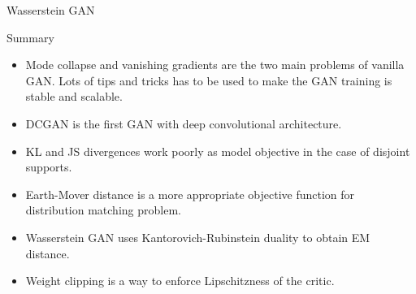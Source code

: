 \begin{frame}{Wasserstein GAN}
\end{frame}
\begin{frame}{Summary}
	\begin{itemize} 
		\item Mode collapse and vanishing gradients are the two main problems of vanilla GAN.  Lots of tips and tricks has to be used to make the GAN training is stable and scalable.
		\vfill
		\item DCGAN is the first GAN with deep convolutional architecture.
		\vfill
		\item KL and JS divergences work poorly as model objective in the case of disjoint supports.
		\vfill
		\item Earth-Mover distance is a more appropriate objective function for distribution matching problem.
		\vfill
		\item Wasserstein GAN uses Kantorovich-Rubinstein duality to obtain EM distance.
		\vfill
		\item Weight clipping is a way to enforce Lipschitzness of the critic.
	\end{itemize}
\end{frame}
 